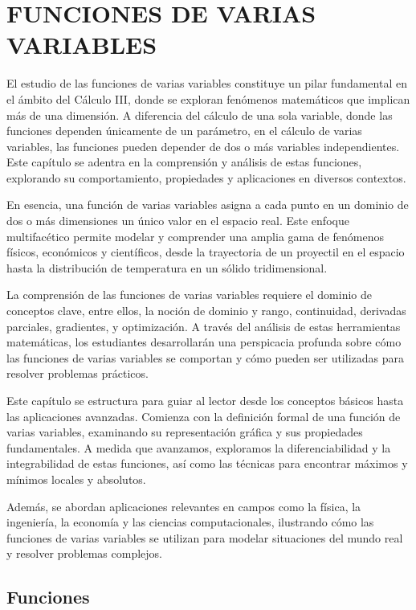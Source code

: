 \chapter{FUNCIONES DE VARIAS VARIABLES}
\printchaptertableofcontents

El estudio de las funciones de varias variables constituye un pilar fundamental en el ámbito del Cálculo III, donde se exploran fenómenos matemáticos que implican más de una dimensión. A diferencia del cálculo de una sola variable, donde las funciones dependen únicamente de un parámetro, en el cálculo de varias variables, las funciones pueden depender de dos o más variables independientes. Este capítulo se adentra en la comprensión y análisis de estas funciones, explorando su comportamiento, propiedades y aplicaciones en diversos contextos.

En esencia, una función de varias variables asigna a cada punto en un dominio de dos o más dimensiones un único valor en el espacio real. Este enfoque multifacético permite modelar y comprender una amplia gama de fenómenos físicos, económicos y científicos, desde la trayectoria de un proyectil en el espacio hasta la distribución de temperatura en un sólido tridimensional.

La comprensión de las funciones de varias variables requiere el dominio de conceptos clave, entre ellos, la noción de dominio y rango, continuidad, derivadas parciales, gradientes, y optimización. A través del análisis de estas herramientas matemáticas, los estudiantes desarrollarán una perspicacia profunda sobre cómo las funciones de varias variables se comportan y cómo pueden ser utilizadas para resolver problemas prácticos.

Este capítulo se estructura para guiar al lector desde los conceptos básicos hasta las aplicaciones avanzadas. Comienza con la definición formal de una función de varias variables, examinando su representación gráfica y sus propiedades fundamentales. A medida que avanzamos, exploramos la diferenciabilidad y la integrabilidad de estas funciones, así como las técnicas para encontrar máximos y mínimos locales y absolutos.

Además, se abordan aplicaciones relevantes en campos como la física, la ingeniería, la economía y las ciencias computacionales, ilustrando cómo las funciones de varias variables se utilizan para modelar situaciones del mundo real y resolver problemas complejos.

\section{Funciones}

